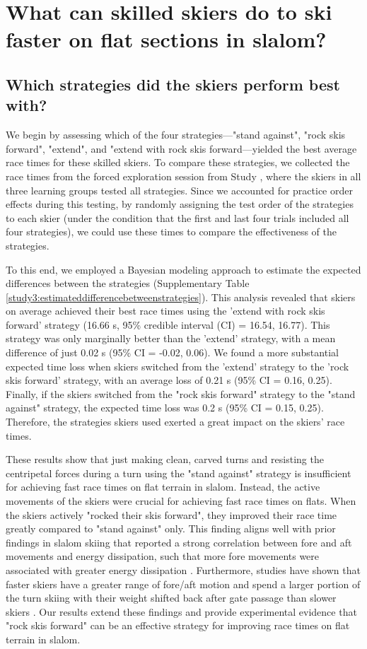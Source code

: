 \section{What can skilled skiers do to ski faster on flat sections in slalom?}


\subsection{Which strategies did the skiers perform best with?}
We begin by assessing which of the four strategies—"stand against", "rock skis forward", "extend", and "extend with rock skis forward—yielded the best average race times for these skilled skiers. To compare these strategies, we collected the race times from the forced exploration session from Study , where the skiers in all three learning groups tested all strategies. Since we accounted for practice order effects during this testing, by randomly assigning the test order of the strategies to each skier (under the condition that the first and last four trials included all four strategies), we could use these times to compare the effectiveness of the strategies. 

To this end, we employed a Bayesian modeling approach to estimate the expected differences between the strategies (Supplementary Table \ref{study3:estimateddifferencebetweenstrategies}). This analysis revealed that skiers on average achieved their best race times using the 'extend with rock skis forward' strategy (16.66 s, 95\% credible interval (CI) = 16.54, 16.77). This strategy was only marginally better than the 'extend' strategy, with a mean difference of just 0.02 s (95\% CI = -0.02, 0.06).  We found a more substantial expected time loss when skiers switched from the 'extend' strategy to the 'rock skis forward' strategy, with an average loss of 0.21 s (95\% CI = 0.16, 0.25). Finally, if the skiers switched from the "rock skis forward" strategy to the "stand against" strategy, the expected time loss was 0.2 s (95\% CI = 0.15, 0.25). Therefore, the strategies skiers used exerted a great impact on the skiers' race times. 

These results show that just making clean, carved turns and resisting the centripetal forces during a turn using the "stand against" strategy is insufficient for achieving fast race times on flat terrain in slalom. Instead, the active movements of the skiers were crucial for achieving fast race times on flats. When the skiers actively "rocked their skis forward", they improved their race time greatly compared to "stand against" only. This finding aligns well with prior findings in slalom skiing that reported a strong correlation between fore and aft movements and energy dissipation, such that more fore movements were associated with greater energy dissipation \cite{reid_turn_2009, reid_kinematic_2010}. Furthermore, studies have shown that faster skiers have a greater range of fore/aft motion and spend a larger portion of the turn skiing with their weight shifted back after gate passage than slower skiers \cite{tjorhom_beskrivelse_2007, reid_kinematic_2010}. Our results extend these findings and provide experimental evidence that "rock skis forward" can be an effective strategy for improving race times on flat terrain in slalom.

